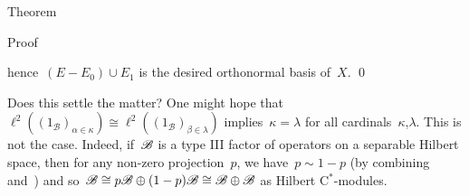 \documentclass[b]{subfiles}
\begin{document}
\begin{parsec}
\begin{point}{Theorem}
\begin{point}{Proof}
\begin{point}
    hence~$(E - E_0) \cup E_1$ is the desired orthonormal basis of~$X$. \qed
\end{point}
\end{point}
\end{point}
\begin{point}%
Does this settle the matter?
      One might hope
    that~$\ell^2((1_{\mathscr{B}})_{\alpha \in \kappa}) \cong
        \ell^2((1_{\mathscr{B}})_{\beta\in\lambda})$
    implies~$\kappa=\lambda$ for all cardinals~$\kappa$,$\lambda$.
This is not the case.
Indeed, if~$\mathscr{B}$ is a type III factor
    of operators on a separable Hilbert space,
    then for any non-zero projection~$p$,
    we have~$p \sim 1 -p$ (by combining~\cite[Dfn.~6.5.1]{kr}
        and~\cite[Cor.~6.3.5]{kr})
    and so~$\mathscr{B} \cong p\mathscr{B} \oplus (1-p)\mathscr{B} \cong 
    \mathscr{B} \oplus \mathscr{B}$ as Hilbert C$^*$-modules.
\end{point}
\end{parsec}
\end{document}
